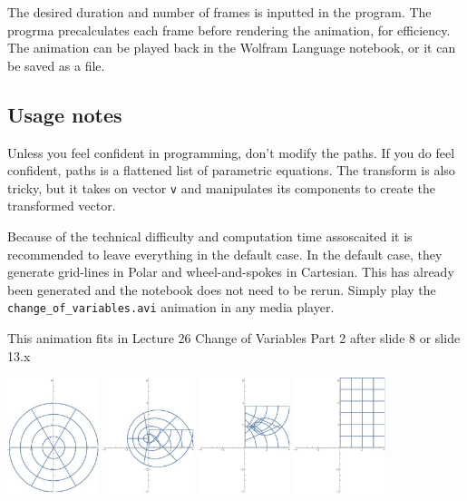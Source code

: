 The desired duration and number of frames is inputted in the program. The progrma precalculates each frame before rendering the animation, for efficiency. The animation can be played back in the Wolfram Language notebook, or it can be saved as a file.

\subsection*{Usage notes}

Unless you feel confident in programming, don't modify the paths. If you do feel confident, paths is a flattened list of parametric equations.  The transform is also tricky, but it takes on vector \verb+v+ and manipulates its components to create the transformed vector.

Because of the technical difficulty and computation time assoscaited it is recommended to leave everything in the default case. In the default case, they generate grid-lines in Polar and wheel-and-spokes in Cartesian. This has already been generated and the notebook does not need to be rerun. Simply play the \verb+change_of_variables.avi+ animation in any media player.

This animation fits in Lecture 26 Change of Variables Part 2 after slide 8 or slide 13.x

\includegraphics[width=0.2\textwidth]{../exhibit/change1.jpg}
\includegraphics[width=0.2\textwidth]{../exhibit/change2.jpg}
\includegraphics[width=0.2\textwidth]{../exhibit/change3.jpg}
\includegraphics[width=0.2\textwidth]{../exhibit/change4.jpg}


